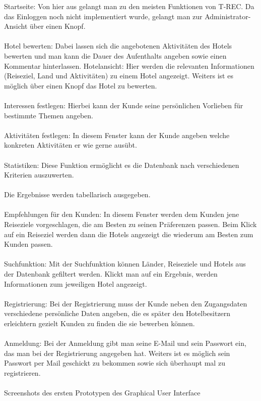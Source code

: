 \documentclass[a4paper]{article}
\begin{document}
Startseite: Von hier aus gelangt man zu den meisten Funktionen von T-REC. Da das Einloggen noch nicht implementiert wurde, gelangt man zur Administrator-Ansicht über einen Knopf. \\ \\
Hotel bewerten: Dabei lassen sich die angebotenen Aktivitäten des Hotels bewerten und man kann die Dauer des Aufenthalts angeben sowie einen Kommentar hinterlassen.
Hotelansicht: Hier werden die relevanten Informationen (Reiseziel, Land und Aktivitäten) zu einem Hotel angezeigt. Weiters ist es möglich über einen Knopf das Hotel zu bewerten.
\\\\
Interessen festlegen: Hierbei kann der Kunde seine persönlichen Vorlieben für bestimmte Themen angeben.
\\\\
Aktivitäten festlegen: In diesem Fenster kann der Kunde angeben welche konkreten Aktivitäten er wie gerne ausübt.
\\\\ 
Statistiken: Diese Funktion ermöglicht es die Datenbank nach verschiedenen Kriterien auszuwerten.
\\\\
Die Ergebnisse werden tabellarisch ausgegeben.
\\\\
Empfehlungen für den Kunden: In diesem Fenster werden dem Kunden jene Reiseziele vorgeschlagen, die am Besten zu seinen Präferenzen passen. Beim Klick auf ein Reiseziel werden dann die Hotels angezeigt die wiederum am Besten zum Kunden passen.
\\\\
Suchfunktion: Mit der Suchfunktion können Länder, Reiseziele und Hotels aus der Datenbank gefiltert werden. Klickt man auf ein Ergebnis, werden Informationen zum jeweiligen Hotel angezeigt.
\\\\
Registrierung: Bei der Registrierung muss der Kunde neben den Zugangsdaten verschiedene persönliche Daten angeben, die es später den Hotelbesitzern erleichtern gezielt Kunden zu finden die sie bewerben können.
\\\\
Anmeldung: Bei der Anmeldung gibt man seine E-Mail und sein Passwort ein, das man bei der Registrierung angegeben hat. Weiters ist es möglich sein Passwort per Mail geschickt zu bekommen sowie sich überhaupt mal zu registrieren.
\\
\\
Screenshots des ersten Prototypen des Graphical User Interface
\end{document}
